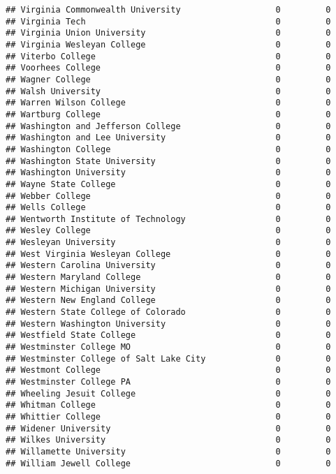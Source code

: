 \documentclass[
]{article}
\begin{document}
\begin{verbatim}
## Virginia Commonwealth University                   0         0
## Virginia Tech                                      0         0
## Virginia Union University                          0         0
## Virginia Wesleyan College                          0         0
## Viterbo College                                    0         0
## Voorhees College                                   0         0
## Wagner College                                     0         0
## Walsh University                                   0         0
## Warren Wilson College                              0         0
## Wartburg College                                   0         0
## Washington and Jefferson College                   0         0
## Washington and Lee University                      0         0
## Washington College                                 0         0
## Washington State University                        0         0
## Washington University                              0         0
## Wayne State College                                0         0
## Webber College                                     0         0
## Wells College                                      0         0
## Wentworth Institute of Technology                  0         0
## Wesley College                                     0         0
## Wesleyan University                                0         0
## West Virginia Wesleyan College                     0         0
## Western Carolina University                        0         0
## Western Maryland College                           0         0
## Western Michigan University                        0         0
## Western New England College                        0         0
## Western State College of Colorado                  0         0
## Western Washington University                      0         0
## Westfield State College                            0         0
## Westminster College MO                             0         0
## Westminster College of Salt Lake City              0         0
## Westmont College                                   0         0
## Westminster College PA                             0         0
## Wheeling Jesuit College                            0         0
## Whitman College                                    0         0
## Whittier College                                   0         0
## Widener University                                 0         0
## Wilkes University                                  0         0
## Willamette University                              0         0
## William Jewell College                             0         0

\end{verbatim}
\end{document}

